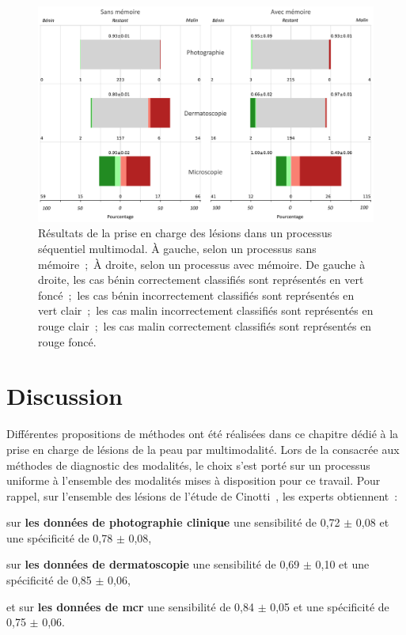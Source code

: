 \begin{figure}[H]
    \centering
    \includegraphics[width=0.9\linewidth]{contents/chapter_8/resources/results_lesions_management.pdf}
    \caption{Résultats de la prise en charge des lésions dans un processus séquentiel multimodal. À gauche, selon un processus sans mémoire~;~À droite, selon un processus avec mémoire. De gauche à droite, les cas bénin correctement classifiés sont représentés en vert foncé~;~les cas bénin incorrectement classifiés sont représentés en vert clair~;~les cas malin incorrectement classifiés sont représentés en rouge clair~;~les cas malin correctement classifiés sont représentés en rouge foncé.}
    \label{fig:results_lesions_management}
\end{figure}\par

\section{Discussion}
Différentes propositions de méthodes ont été réalisées dans ce chapitre dédié à la prise en charge de lésions de la peau par multimodalité. Lors de la  consacrée aux méthodes de diagnostic des modalités, le choix s'est porté sur un processus uniforme à l'ensemble des modalités mises à disposition pour ce travail. Pour rappel, sur l’ensemble des lésions de l'étude de Cinotti~, les experts obtiennent~: 
\begin{inlinerate}
    \item sur \textbf{les données de photographie clinique} une sensibilité de 0,72 $\pm$ 0,08 et une spécificité de 0,78 $\pm$ 0,08,
    \item sur \textbf{les données de dermatoscopie} une sensibilité de 0,69 $\pm$ 0,10 et une spécificité de 0,85 $\pm$ 0,06,
    \item et sur \textbf{les données de \gls{mcr}} une sensibilité de 0,84 $\pm$ 0,05 et une spécificité de 0,75 $\pm$ 0,06.
\end{inlinerate}

